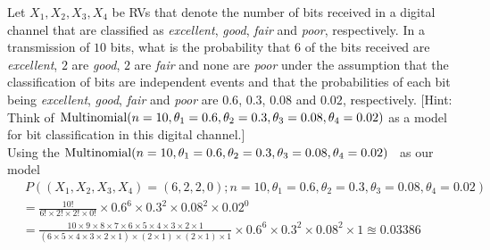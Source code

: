 \begin{ExerciseList}
\Exercise
Let $X_1,X_2,X_3,X_4$ be RVs that denote the number of bits received in a digital channel that are classified as {\em excellent}, {\em good}, {\em fair} and {\em poor}, respectively.  
In a transmission of $10$ bits, what is the probability that $6$ of the bits received are {\em excellent}, $2$ are {\em good}, $2$ are {\em fair} and none are {\em poor} under the assumption that the classification of bits are independent events and that the probabilities of each bit being {\em excellent}, {\em good}, {\em fair} and {\em poor} are $0.6$, $0.3$, $0.08$ and $0.02$, respectively. 
[Hint: Think of $\mbox{{\rm Multinomial}}(n=10,\theta_1=0.6,\theta_2=0.3,\theta_3=0.08,\theta_4=0.02)$ as a model for bit classification in this digital channel.]
\Answer
~\\
Using the $\mbox{{\rm Multinomial}}(n=10,\theta_1=0.6,\theta_2=0.3,\theta_3=0.08,\theta_4=0.02)$ \rv~as our model
\begin{align*}
&~ P\left( (X_1,X_2,X_3,X_4)=(6,2,2,0); n=10,\theta_1=0.6,\theta_2=0.3,\theta_3=0.08,\theta_4=0.02 \right)\\ 
&= \frac{10!}{6! \times 2! \times 2! \times 0!} \times 0.6^6 \times 0.3^2 \times 0.08^2 \times 0.02^0\\
&= \frac{10 \times 9 \times 8 \times 7 \times 6 \times 5 \times 4 \times 3 \times 2 \times 1}{(6 \times 5 \times 4 \times 3 \times 2 \times 1) \times (2 \times 1) \times (2 \times 1) \times 1} \times  0.6^6 \times 0.3^2 \times 0.08^2 \times 1 \approxeq 0.03386\\
\end{align*}


\end{ExerciseList}

